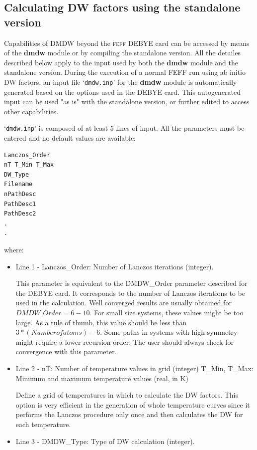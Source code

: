 \documentclass[11pt,oneside]{report} %
\newcommand{\program}[1]{\textsc{#1}}
\newcommand{\feff}{\program{feff}}
\newcommand{\file}[1]{`\texttt{#1}'}
\newcommand{\module}[1]{\textrm{\bf{#1}}}
\begin{document}
\begin{latexonly}
\subsection{Calculating DW factors using the standalone version}
Capabilities of DMDW beyond the {\feff} DEBYE card can be accessed by means of the \module{dmdw} module or by
compiling the standalone version. All the detailes described below apply to
the input used by both the \module{dmdw} module and the standalone version. During the
execution of a normal FEFF run using ab initio DW factors, an input file \file{dmdw.inp} for the
\module{dmdw} module is automatically generated based on the options used in the DEBYE
card. This autogenerated input can be used "as is" with the standalone version,
or further edited to access other capabilities.

\file{dmdw.inp} is composed of at least 5 lines of input.  All the
parameters must be entered and no default values are available:
\begin{verbatim}
Lanczos_Order
nT T_Min T_Max
DW_Type
Filename
nPathDesc
PathDesc1
PathDesc2
.
.
\end{verbatim}
where:
\begin{itemize}
\item Line  1 - Lanczos\_Order: Number of Lanczos iterations (integer).

  This parameter is equivalent to the DMDW\_Order parameter described for
  the DEBYE card. It corresponds to the number of Lanczos iterations to be used
  in the calculation. Well converged results are usually obtained for
  $DMDW\_Order=6-10$. For small size systems, these values might be too large. As a
  rule of thumb, this value should be less than $3*(Number of atoms)-6$. Some
  paths in systems with high symmetry might require a lower recursion
  order. The user should always check for convergence with this parameter.

\item Line  2 - nT: Number of temperature values in grid (integer)
          T\_Min, T\_Max: Minimum and maximum temperature values (real, in K)

  Define a grid of temperatures in which to calculate the DW factors. This
  option is very efficient in the generation of whole temperature curves since
  it performs the Lanczos procedure only once and then calculates the DW for
  each temperature.

\item Line  3 - DMDW\_Type: Type of DW calculation (integer).


\end{itemize}
\end{latexonly}
\end{document}
